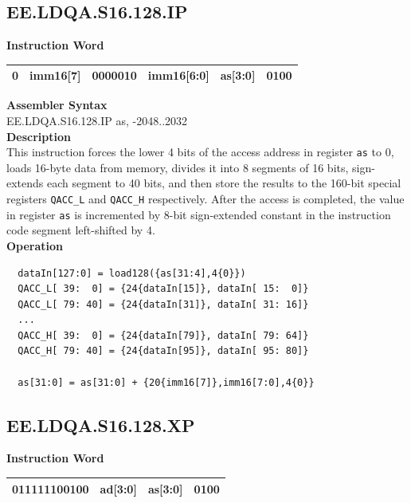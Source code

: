 \clearpage
\subsection{EE.LDQA.S16.128.IP}\label{instruction:EELDQAS16128IP}
\setlength\tabcolsep{6pt}
\textbf{Instruction Word} \\
\begin{tabular}{|c|c|c|c|c|c|}
	\hline
	0 & imm16[7] & 0000010 & imm16[6:0] & as[3:0] & 0100 \\
	\hline
\end{tabular}

\textbf{Assembler Syntax} \\
EE.LDQA.S16.128.IP as, -2048..2032 \\
\textbf{Description} \\
This instruction forces the lower 4 bits of the access address in register \lstinline{as} to 0, loads 16-byte data from memory, divides it into 8 segments of 16 bits, sign-extends each segment to 40 bits, and then store the results to the 160-bit special registers \lstinline{QACC_L} and \lstinline{QACC_H} respectively. After the access is completed, the value in register \lstinline{as} is incremented by 8-bit sign-extended constant in the instruction code segment left-shifted by 4.\\
\textbf{Operation}
\begin{lstlisting}
  dataIn[127:0] = load128({as[31:4],4{0}})
  QACC_L[ 39:  0] = {24{dataIn[15]}, dataIn[ 15:  0]}
  QACC_L[ 79: 40] = {24{dataIn[31]}, dataIn[ 31: 16]}
  ...
  QACC_H[ 39:  0] = {24{dataIn[79]}, dataIn[ 79: 64]}
  QACC_H[ 79: 40] = {24{dataIn[95]}, dataIn[ 95: 80]}

  as[31:0] = as[31:0] + {20{imm16[7]},imm16[7:0],4{0}}
\end{lstlisting}

\clearpage
\subsection{EE.LDQA.S16.128.XP}\label{instruction:EELDQAS16128XP}
\setlength\tabcolsep{6pt}
\textbf{Instruction Word} \\
\begin{tabular}{|c|c|c|c|}
	\hline
	011111100100 & ad[3:0] & as[3:0] & 0100 \\
	\hline
\end{tabular}

